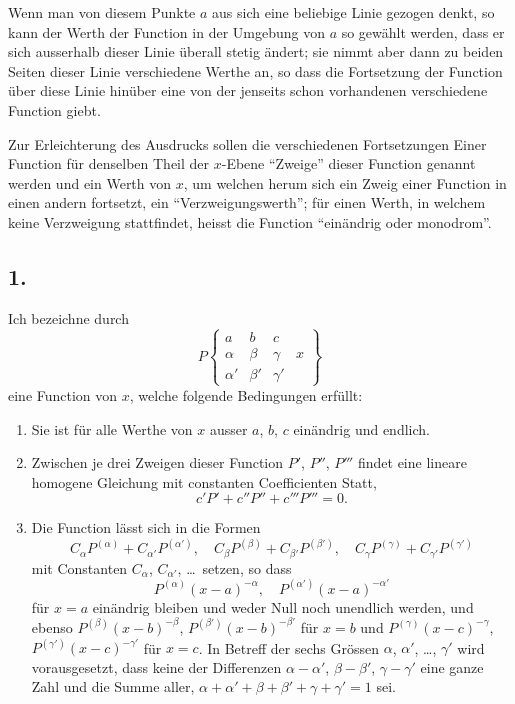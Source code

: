 \documentclass[12pt,a4paper]{article}
\begin{document}
Wenn man von diesem Punkte $a$ aus sich eine beliebige Linie gezogen denkt, so kann der Werth der Function in der Umgebung von $a$ so gewählt werden, dass er sich ausserhalb dieser Linie überall stetig ändert; sie nimmt aber dann zu beiden Seiten dieser Linie verschiedene Werthe an, so dass die Fortsetzung der Function über diese Linie hinüber eine von der jenseits schon vorhandenen verschiedene Function giebt.

Zur Erleichterung des Ausdrucks sollen die verschiedenen Fortsetzungen Einer Function für denselben Theil der $x$-Ebene ``Zweige'' dieser Function genannt werden und ein Werth von $x$, um welchen herum sich ein Zweig einer Function in einen andern fortsetzt, ein ``Verzweigungswerth''; für einen Werth, in welchem keine Verzweigung stattfindet, heisst die Function ``einändrig oder monodrom''.

\subsection*{1.}

Ich bezeichne durch
\[
P\left\{\begin{array}{ccc|c}
a & b & c & \\
\alpha & \beta & \gamma & x \\
\alpha' & \beta' & \gamma' &
\end{array}\right\}
\]
eine Function von $x$, welche folgende Bedingungen erfüllt:
\begin{enumerate}
\item Sie ist für alle Werthe von $x$ ausser $a$, $b$, $c$ einändrig und endlich.
\item Zwischen je drei Zweigen dieser Function $P'$, $P''$, $P'''$ findet eine lineare homogene Gleichung mit constanten Coefficienten Statt,
\[
c'P' + c''P'' + c'''P''' = 0.
\]
\item Die Function lässt sich in die Formen
\[
C_{\alpha} P^{(\alpha)} + C_{\alpha'} P^{(\alpha')}, \quad
C_{\beta} P^{(\beta)} + C_{\beta'} P^{(\beta')}, \quad
C_{\gamma} P^{(\gamma)} + C_{\gamma'} P^{(\gamma')}
\]
mit Constanten $C_{\alpha}$, $C_{\alpha'}$, \dots\ setzen, so dass
\[
P^{(\alpha)}(x-a)^{-\alpha}, \quad P^{(\alpha')}(x-a)^{-\alpha'}
\]
für $x = a$ einändrig bleiben und weder Null noch unendlich werden, und ebenso $P^{(\beta)}(x-b)^{-\beta}$, $P^{(\beta')}(x-b)^{-\beta'}$ für $x = b$ und $P^{(\gamma)}(x-c)^{-\gamma}$, $P^{(\gamma')}(x-c)^{-\gamma'}$ für $x = c$. In Betreff der sechs Grössen $\alpha$, $\alpha'$, \dots, $\gamma'$ wird vorausgesetzt, dass keine der Differenzen $\alpha - \alpha'$, $\beta - \beta'$, $\gamma - \gamma'$ eine ganze Zahl und die Summe aller, $\alpha + \alpha' + \beta + \beta' + \gamma + \gamma' = 1$ sei.
\end{enumerate}
\end{document}
